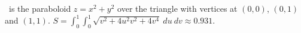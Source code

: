 {\surfaceS\ is the paraboloid $z=x^2+y^2$ over the triangle with vertices at $(0,0)$, $(0,1)$ and $(1,1)$.
}
{$S = \int_0^1\int_0^1\sqrt{v^2+4u^2v^2+4v^4}\ du\ dv \approx 0.931$.
}
